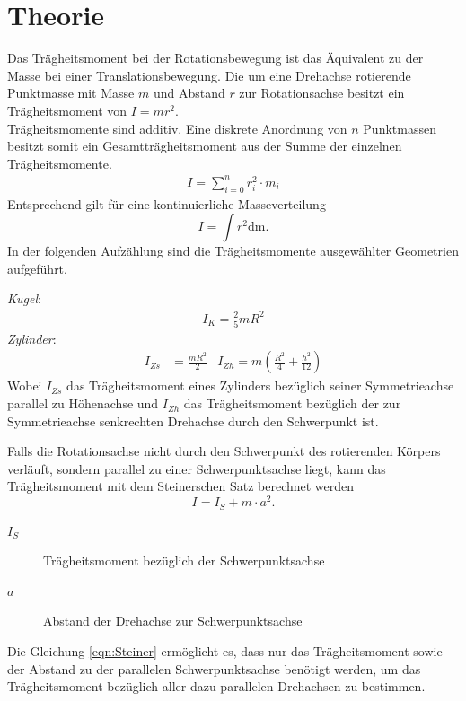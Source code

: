 %
\section{Theorie}
Das Trägheitsmoment bei der Rotationsbewegung ist das Äquivalent zu der Masse bei einer Translationsbewegung. Die um eine Drehachse rotierende Punktmasse mit Masse $m$ und Abstand $r$ zur Rotationsachse besitzt ein Trägheitsmoment von $I = mr^2$.\\
Trägheitsmomente sind additiv.
Eine diskrete Anordnung von $n$ Punktmassen besitzt somit ein Gesamtträgheitsmoment aus der Summe der einzelnen Trägheitsmomente.
\begin{align}
  I= \sum_{i = 0}^n r_i^2\cdot m_i
\end{align}
Entsprechend gilt für eine kontinuierliche Masseverteilung
\begin{equation}
  \label{eqn:Trägheitsmoment}
  I = \int r^2 \mathup{dm}.
\end{equation}
In der folgenden Aufzählung sind die Trägheitsmomente ausgewählter Geometrien aufgeführt.

\emph{Kugel}:
\begin{align}
  I_K = \frac{2}{5}mR^2
\end{align}
\emph{Zylinder}:
\begin{align}
  I_{Zs} &= \frac{mR^2}{2} &
  I_{Zh} = m(\frac{R^2}{4} + \frac{h^2}{12})
\end{align}
Wobei $I_{Zs}$ das Trägheitsmoment eines Zylinders bezüglich seiner Symmetrieachse parallel zu Höhenachse und $I_{Zh}$ das Trägheitsmoment bezüglich der zur Symmetrieachse senkrechten Drehachse durch
den Schwerpunkt ist.

Falls die Rotationsachse nicht durch den Schwerpunkt des rotierenden Körpers verläuft, sondern parallel zu einer Schwerpunktsachse liegt, kann das Trägheitsmoment mit dem Steinerschen Satz
berechnet werden
\begin{equation}
  \label{eqn:Steiner}
  I = I_S + m\cdot a^2.
\end{equation}
\begin{description}
  \item[$I_S$]Trägheitsmoment bezüglich der Schwerpunktsachse
  \item[$a$]Abstand der Drehachse zur Schwerpunktsachse
\end{description}
Die Gleichung \eqref{eqn:Steiner} ermöglicht es, dass nur das Trägheitsmoment sowie der Abstand zu der parallelen Schwerpunktsachse benötigt werden, um das Trägheitsmoment
bezüglich aller dazu parallelen Drehachsen zu bestimmen.
